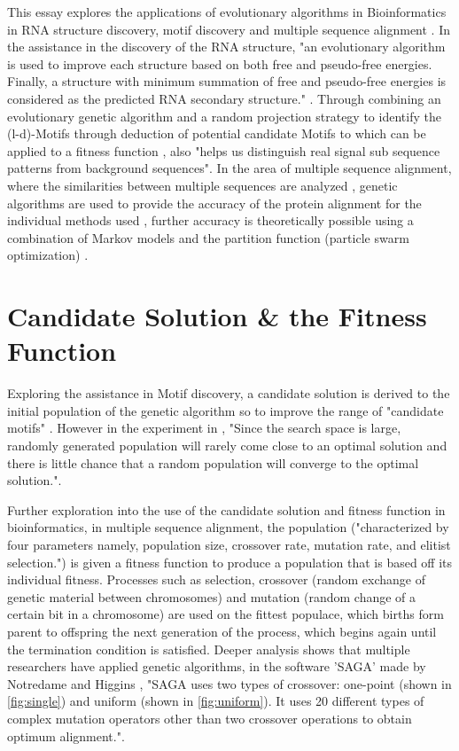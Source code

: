 \documentclass[12pt]{article}
\begin{document}
This essay explores the applications of evolutionary algorithms in Bioinformatics in RNA structure discovery, motif discovery \cite{Piserchia} and multiple sequence alignment \cite{Radenbaugh}. In the assistance in the discovery of the RNA structure, "an evolutionary algorithm is used to improve each structure based on both free and pseudo-free energies. Finally, a structure with minimum summation of free and pseudo-free energies is considered as the predicted RNA secondary structure." \cite{RNA}. Through combining an evolutionary genetic algorithm and a random projection strategy to identify the (l-d)-Motifs through deduction of potential candidate Motifs to which can be applied to a fitness function \cite{Motif}, also "helps us distinguish real signal sub sequence patterns from background sequences"\cite{Wong}. In the area of multiple sequence alignment, where the similarities between multiple sequences are analyzed \cite{Wong}, genetic algorithms are used to provide the accuracy of the protein alignment for the individual methods used \cite{Multiple1}, further accuracy is theoretically possible using a combination of Markov models and the partition function (particle swarm optimization) \cite{Multiple2}.

\section{Candidate Solution \& the Fitness Function}
\label{Candidate Solution & the Fitness Function Section}

Exploring the assistance in Motif discovery, a candidate solution is derived to the initial population of the genetic algorithm so to improve the range of "candidate motifs" \cite{Motif}. However in the experiment in \cite{Motif}, "Since the search space is large, randomly generated population will rarely come close to an optimal solution and there is little chance that a random population will converge to the optimal solution."\cite{Motif}.

Further exploration into the use of the candidate solution and fitness function in bioinformatics, in multiple sequence alignment, the population ("characterized by four parameters namely, population size, crossover rate, mutation rate, and elitist selection."\cite{Multiple1}) is given a fitness function to produce a population that is based off its individual fitness. Processes such as selection, crossover (random exchange of genetic material between chromosomes) and mutation (random change of a certain bit in a chromosome) are used on the fittest populace, which births form parent to offspring the next generation of the process, which begins again until the termination condition is satisfied. Deeper analysis shows that multiple researchers have applied genetic algorithms, in the software 'SAGA' made by Notredame and Higgins \cite{Multiple3}, "SAGA uses two types of crossover: one-point (shown in \cref{fig:single}) and uniform (shown in \cref{fig:uniform}). It uses 20 different types of complex mutation operators other than two crossover operations to obtain optimum alignment."\cite{Multiple1}. 
\end{document}
